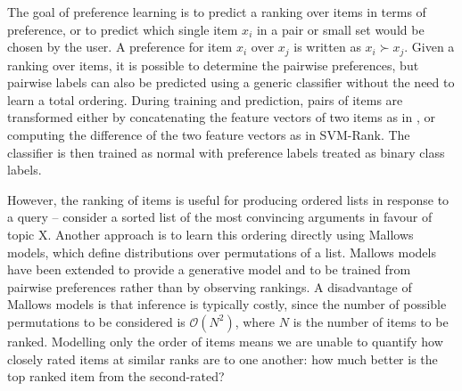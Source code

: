 The goal of preference learning is to predict a ranking over items in terms of preference,
or to predict which single item $x_i$ in a pair or small set would be chosen by the user. 
A preference for item $x_i$ over $x_j$ is written as $x_i \succ x_j$.
Given a ranking over items, it is possible to determine the pairwise preferences,
but pairwise labels can also be predicted using a generic classifier without the need to learn a total ordering.
During training and prediction, pairs of items are transformed either by concatenating the feature vectors of two items as in \cite{habernal2016argument}, 
or computing the difference of the two feature vectors as in SVM-Rank\cite{joachims2002optimizing}. 
The classifier is then trained as normal with preference labels treated as binary class labels.

However, the ranking of items is useful for producing ordered lists in response to a query -- 
consider a sorted list of the most convincing arguments in favour of topic X.
Another approach is to learn this ordering directly using Mallows models\cite{mallows1957non},
which define distributions over permutations of a list. 
Mallows models have been extended to provide a generative model\cite{qin2010new} and 
to be trained from pairwise preferences rather than by observing rankings\cite{lu2011learning}. 
A disadvantage of Mallows models is that inference is typically costly, 
since the number of possible permutations to be considered is $\mathcal{O}(N^2)$, 
where $N$ is the number of items to be ranked. 
Modelling only the order of items means we are unable to quantify 
how closely rated items at similar ranks are to one another: how much better is the top ranked item 
from the second-rated?

